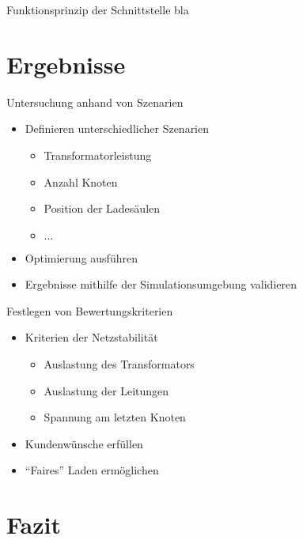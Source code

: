 \documentclass[aspectratio=169]{beamer}
\begin{document}
\begin{frame}{Funktionsprinzip der Schnittstelle}
bla
\end{frame}


\section{Ergebnisse}

\begin{frame}{Untersuchung anhand von Szenarien}
	\begin{itemize}
		\item Definieren unterschiedlicher Szenarien
		\begin{itemize}
			\item Transformatorleistung
			\item Anzahl Knoten
			\item Position der Ladesäulen
			\item $\dots$
		\end{itemize}
		\item Optimierung ausführen
		\item Ergebnisse mithilfe der Simulationsumgebung validieren
	\end{itemize}
\end{frame}


\begin{frame}{Festlegen von Bewertungskriterien}
	\begin{itemize}
		\item Kriterien der Netzstabilität
		\begin{itemize}
			\item Auslastung des Transformators
			\item Auslastung der Leitungen
			\item Spannung am letzten Knoten
		\end{itemize}
		\item Kundenwünsche erfüllen
		\item \enquote{Faires} Laden ermöglichen
	\end{itemize}
\end{frame}


\section{Fazit}
\end{document}
